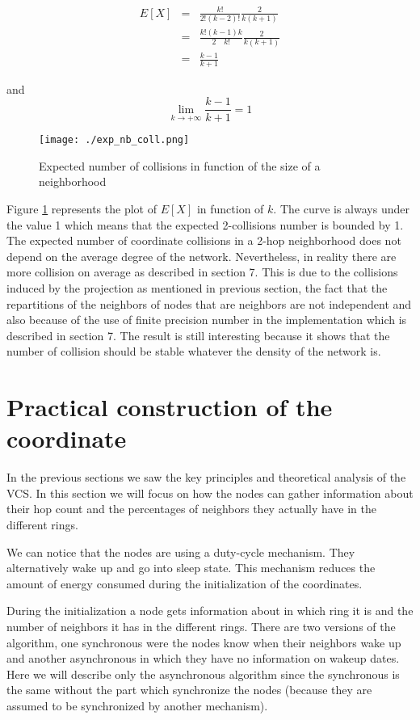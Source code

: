 \documentclass[a4paper]{article}
\begin{document}
\begin{eqnarray*}
  E[X] & = & \frac{k!}{2!(k-2)!} \frac{2}{k(k+1)}\\
  & = &  \frac{k!(k-1)k}{2\quad k!} \frac{2}{k(k+1)}\\
  & = & \frac{k-1}{k+1}
\end{eqnarray*}

and \[
     \lim_{k \to +\infty} \frac{k-1}{k+1} = 1
    \]

\begin{figure}[!h]
  \centering
  \texttt{[image: ./exp\_nb\_coll.png]}
  \caption{Expected number of collisions in function of the size of a neighborhood}
  \label{theo}
\end{figure}

Figure \ref{theo} represents the plot of $E[X]$ in function of $k$. The curve is always under the value 1 which means that the expected 2-collisions number is bounded by 1. The expected number of coordinate collisions in a 2-hop neighborhood does not depend on the average degree of the network. Nevertheless, in reality there are more collision on average as described in section 7. This is due to the collisions induced by the projection as mentioned in previous section, the fact that the repartitions of the neighbors of nodes that are neighbors are not independent and also because of the use of finite precision number in the implementation which is described in section 7. The result is still interesting because it shows that the number of collision should be stable whatever the density of the network is.

\section{Practical construction of the coordinate}
In the previous sections we saw the key principles and theoretical analysis of the VCS. In this section we will focus on how the nodes can gather information about their hop count and the percentages of neighbors they actually have in the different rings.

We can notice that the nodes are using a duty-cycle \cite{Polastre04} mechanism. They alternatively wake up and go into sleep state. This mechanism reduces the amount of energy consumed during the initialization of the coordinates.


During the initialization a node gets information about in which ring it is and the number of neighbors it has in the different rings. There are two versions of the algorithm, one synchronous were the nodes know when their neighbors wake up and another asynchronous in which they have no information on wakeup dates. Here we will describe only the asynchronous algorithm since the synchronous is the same without the part which synchronize the nodes (because they are assumed to be synchronized by another mechanism).
\end{document}
